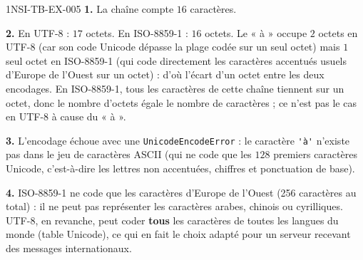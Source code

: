 \begin{corrige}{1NSI-TB-EX-005}
\textbf{1.} La chaîne compte $16$ caractères.

\textbf{2.} En UTF-8 : $17$ octets. En ISO-8859-1 : $16$ octets. Le « à » occupe $2$ octets
en UTF-8 (car son code Unicode dépasse la plage codée sur un seul octet) mais $1$ seul octet
en ISO-8859-1 (qui code directement les caractères accentués usuels d'Europe de l'Ouest sur
un octet) : d'où l'écart d'un octet entre les deux encodages. En ISO-8859-1, tous les
caractères de cette chaîne tiennent sur un octet, donc le nombre d'octets égale le nombre de
caractères ; ce n'est pas le cas en UTF-8 à cause du « à ».

\textbf{3.} L'encodage échoue avec une \lstinline{UnicodeEncodeError} : le caractère
\lstinline{'à'} n'existe pas dans le jeu de caractères ASCII (qui ne code que les $128$
premiers caractères Unicode, c'est-à-dire les lettres non accentuées, chiffres et
ponctuation de base).

\textbf{4.} ISO-8859-1 ne code que les caractères d'Europe de l'Ouest (256 caractères au
total) : il ne peut pas représenter les caractères arabes, chinois ou cyrilliques. UTF-8, en
revanche, peut coder \textbf{tous} les caractères de toutes les langues du monde (table
Unicode), ce qui en fait le choix adapté pour un serveur recevant des messages
internationaux.
\end{corrige}
